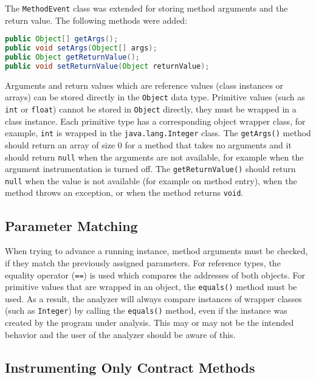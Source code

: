 The \texttt{MethodEvent} class was extended for storing method arguments and the
return value. The following methods were added:

\begin{lstlisting}[language=java]
public Object[] getArgs();
public void setArgs(Object[] args);
public Object getReturnValue();
public void setReturnValue(Object returnValue);
\end{lstlisting}

Arguments and return values which are reference values (class instances or
arrays) can be stored directly in the \texttt{Object} data type. Primitive
values (such as \texttt{int} or \texttt{float}) cannot be stored in
\texttt{Object} directly, they must be wrapped in a class instance. Each
primitive type has a corresponding object wrapper class, for example,
\texttt{int} is wrapped in the \texttt{java.lang.Integer} class. The
\texttt{getArgs()} method should return an array of size 0 for a method that
takes no arguments and it should return \texttt{null} when the arguments are not
available, for example when the argument instrumentation is turned off. The
\texttt{getReturnValue()} should return \texttt{null} when the value is not
available (for example on method entry), when the method throws an exception, or
when the method returns \texttt{void}.

\subsection{Parameter Matching}
When trying to advance a running instance, method arguments must be checked, if
they match the previously assigned parameters. For reference types, the equality
operator (\texttt{==}) is used which compares the addresses of both objects. For
primitive values that are wrapped in an object, the \texttt{equals()} method
must be used. As a result, the analyzer will always compare instances of wrapper
classes (such as \texttt{Integer}) by calling the \texttt{equals()} method, even
if the instance was created by the program under analysis. This may or may not
be the intended behavior and the user of the analyzer should be aware of this.

\subsection{Instrumenting Only Contract Methods}


